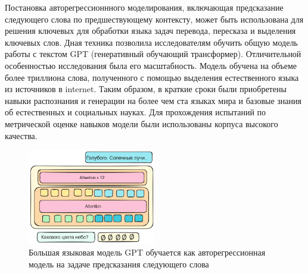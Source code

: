 Постановка авторегрессионнного моделирования, включающая предсказание следующего слова по предшествующему контексту,
может быть использована для решения ключевых для обработки языка задач перевода, пересказа и выделения ключевых слов. 
Дная техника позволила исследователям \cite{radford2021learning} обучить
общую модель работы с текстом GPT (генеративный обучающий трансформер). Отличительной особенностью исследования была его
масштабность. Модель обучена на объеме более триллиона слова, полученного с помощью выделения естественного языка из источников в internet.
Таким образом, в краткие сроки были приобретены навыки распознания и генерации на более чем ста языках мира и базовые знания об естественных и социальных науках.
Для прохождения испытаний по метрической оценке навыков модели были использованы корпуса высокого качества. 

\begin{figure}[h]
    \centering
    \includegraphics[width=0.5\textwidth]{assets/ml/nlp/gpt.excalidraw.png}
    \caption{Большая языковая модель GPT обучается как авторегрессионная модель на задаче предсказания следующего слова}
    \label{gpt}
\end{figure}

